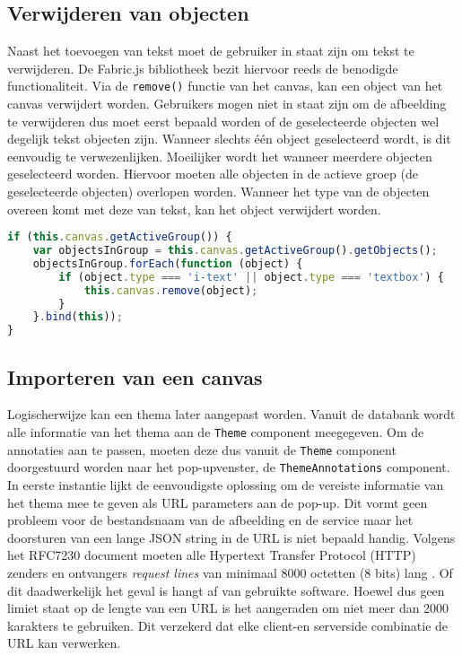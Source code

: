 \subsection{Verwijderen van objecten}
Naast het toevoegen van tekst moet de gebruiker in staat zijn om tekst te verwijderen. De Fabric.js bibliotheek bezit hiervoor reeds de benodigde functionaliteit. Via de \lstinline{remove()} functie van het canvas, kan een object van het canvas verwijdert worden. Gebruikers mogen niet in staat zijn om de afbeelding te verwijderen dus moet eerst bepaald worden of de geselecteerde objecten wel degelijk tekst objecten zijn. Wanneer slechts \'{e}\'{e}n object geselecteerd wordt, is dit eenvoudig te verwezenlijken. Moeilijker wordt het wanneer meerdere objecten geselecteerd worden. Hiervoor moeten alle objecten in de actieve groep (de geselecteerde objecten) overlopen worden. Wanneer het type van de objecten overeen komt met deze van tekst, kan het object verwijdert worden. 

\begin{lstlisting}[caption={ThemeAnnotations component - delete group},label=lst:ThemeAnnotationsDeleteGroup,language=javascript]
if (this.canvas.getActiveGroup()) {
	var objectsInGroup = this.canvas.getActiveGroup().getObjects();
	objectsInGroup.forEach(function (object) {
		if (object.type === 'i-text' || object.type === 'textbox') {
			this.canvas.remove(object);
		}
	}.bind(this));
}
\end{lstlisting}

\subsection{Importeren van een canvas}
Logischerwijze kan een thema later aangepast worden. Vanuit de databank wordt alle informatie van het thema aan de \lstinline{Theme} component meegegeven. Om de annotaties aan te passen, moeten deze dus vanuit de \lstinline{Theme} component doorgestuurd worden naar het pop-upvenster, de \lstinline{ThemeAnnotations} component. In eerste instantie lijkt de eenvoudigste oplossing om de vereiste informatie van het thema mee te geven als URL parameters aan de pop-up. Dit vormt geen probleem voor de bestandsnaam van de afbeelding en de service maar het doorsturen van een lange JSON string in de URL is niet bepaald handig. Volgens het RFC7230 document moeten alle Hypertext Transfer Protocol (HTTP) zenders en ontvangers \textit{request lines} van minimaal 8000 octetten (8 bits) lang \cite{RFC7230}. Of dit daadwerkelijk het geval is hangt af van gebruikte software. %
Hoewel dus geen limiet staat op de lengte van een URL is het aangeraden om niet meer dan 2000 karakters te gebruiken. Dit verzekerd dat elke client-en serverside combinatie de URL kan verwerken. %

